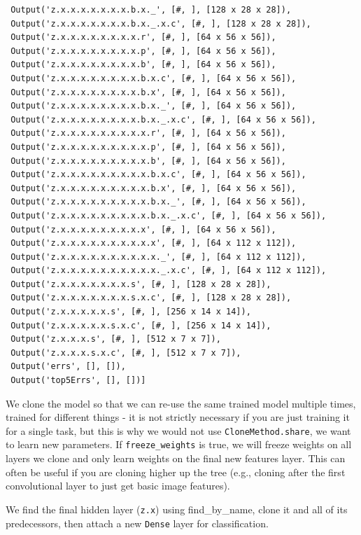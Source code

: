\documentclass[]{book}
\theoremstyle{definition}
\theoremstyle{definition}
\theoremstyle{definition}
\theoremstyle{remark}
\begin{document}
\begin{verbatim}
 Output('z.x.x.x.x.x.x.x.b.x._', [#, ], [128 x 28 x 28]),
 Output('z.x.x.x.x.x.x.x.b.x._.x.c', [#, ], [128 x 28 x 28]),
 Output('z.x.x.x.x.x.x.x.x.r', [#, ], [64 x 56 x 56]),
 Output('z.x.x.x.x.x.x.x.x.p', [#, ], [64 x 56 x 56]),
 Output('z.x.x.x.x.x.x.x.x.b', [#, ], [64 x 56 x 56]),
 Output('z.x.x.x.x.x.x.x.x.b.x.c', [#, ], [64 x 56 x 56]),
 Output('z.x.x.x.x.x.x.x.x.b.x', [#, ], [64 x 56 x 56]),
 Output('z.x.x.x.x.x.x.x.x.b.x._', [#, ], [64 x 56 x 56]),
 Output('z.x.x.x.x.x.x.x.x.b.x._.x.c', [#, ], [64 x 56 x 56]),
 Output('z.x.x.x.x.x.x.x.x.x.r', [#, ], [64 x 56 x 56]),
 Output('z.x.x.x.x.x.x.x.x.x.p', [#, ], [64 x 56 x 56]),
 Output('z.x.x.x.x.x.x.x.x.x.b', [#, ], [64 x 56 x 56]),
 Output('z.x.x.x.x.x.x.x.x.x.b.x.c', [#, ], [64 x 56 x 56]),
 Output('z.x.x.x.x.x.x.x.x.x.b.x', [#, ], [64 x 56 x 56]),
 Output('z.x.x.x.x.x.x.x.x.x.b.x._', [#, ], [64 x 56 x 56]),
 Output('z.x.x.x.x.x.x.x.x.x.b.x._.x.c', [#, ], [64 x 56 x 56]),
 Output('z.x.x.x.x.x.x.x.x.x', [#, ], [64 x 56 x 56]),
 Output('z.x.x.x.x.x.x.x.x.x.x', [#, ], [64 x 112 x 112]),
 Output('z.x.x.x.x.x.x.x.x.x.x._', [#, ], [64 x 112 x 112]),
 Output('z.x.x.x.x.x.x.x.x.x.x._.x.c', [#, ], [64 x 112 x 112]),
 Output('z.x.x.x.x.x.x.x.s', [#, ], [128 x 28 x 28]),
 Output('z.x.x.x.x.x.x.x.s.x.c', [#, ], [128 x 28 x 28]),
 Output('z.x.x.x.x.x.s', [#, ], [256 x 14 x 14]),
 Output('z.x.x.x.x.x.s.x.c', [#, ], [256 x 14 x 14]),
 Output('z.x.x.x.s', [#, ], [512 x 7 x 7]),
 Output('z.x.x.x.s.x.c', [#, ], [512 x 7 x 7]),
 Output('errs', [], []),
 Output('top5Errs', [], [])]
\end{verbatim}

We clone the model so that we can re-use the same trained model multiple
times, trained for different things - it is not strictly necessary if
you are just training it for a single task, but this is why we would not
use \texttt{CloneMethod.share}, we want to learn new parameters. If
\texttt{freeze\_weights} is true, we will freeze weights on all layers
we clone and only learn weights on the final new features layer. This
can often be useful if you are cloning higher up the tree (e.g., cloning
after the first convolutional layer to just get basic image features).

We find the final hidden layer (\texttt{z.x}) using find\_by\_name,
clone it and all of its predecessors, then attach a new \texttt{Dense}
layer for classification.
\end{document}

